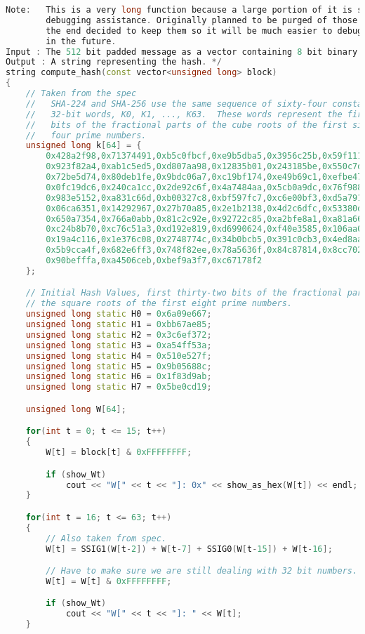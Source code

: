 \begin{lstlisting}[language = C++]
Note:	This is a very long function because a large portion of it is solely
		debugging assistance. Originally planned to be purged of those but in
		the end decided to keep them so it will be much easier to debug this
		in the future.
Input : The 512 bit padded message as a vector containing 8 bit binary ASCII values.
Output : A string representing the hash. */
string compute_hash(const vector<unsigned long> block)
{
	// Taken from the spec
	//   SHA-224 and SHA-256 use the same sequence of sixty-four constant
	//   32-bit words, K0, K1, ..., K63.  These words represent the first 32
	//   bits of the fractional parts of the cube roots of the first sixty-
	//   four prime numbers.
	unsigned long k[64] = {
		0x428a2f98,0x71374491,0xb5c0fbcf,0xe9b5dba5,0x3956c25b,0x59f111f1,
		0x923f82a4,0xab1c5ed5,0xd807aa98,0x12835b01,0x243185be,0x550c7dc3,
		0x72be5d74,0x80deb1fe,0x9bdc06a7,0xc19bf174,0xe49b69c1,0xefbe4786,
		0x0fc19dc6,0x240ca1cc,0x2de92c6f,0x4a7484aa,0x5cb0a9dc,0x76f988da,
		0x983e5152,0xa831c66d,0xb00327c8,0xbf597fc7,0xc6e00bf3,0xd5a79147,
		0x06ca6351,0x14292967,0x27b70a85,0x2e1b2138,0x4d2c6dfc,0x53380d13,
		0x650a7354,0x766a0abb,0x81c2c92e,0x92722c85,0xa2bfe8a1,0xa81a664b,
		0xc24b8b70,0xc76c51a3,0xd192e819,0xd6990624,0xf40e3585,0x106aa070,
		0x19a4c116,0x1e376c08,0x2748774c,0x34b0bcb5,0x391c0cb3,0x4ed8aa4a,
		0x5b9cca4f,0x682e6ff3,0x748f82ee,0x78a5636f,0x84c87814,0x8cc70208,
		0x90befffa,0xa4506ceb,0xbef9a3f7,0xc67178f2
	};

	// Initial Hash Values, first thirty-two bits of the fractional parts of
	// the square roots of the first eight prime numbers. 
	unsigned long static H0 = 0x6a09e667;
	unsigned long static H1 = 0xbb67ae85;
	unsigned long static H2 = 0x3c6ef372;
	unsigned long static H3 = 0xa54ff53a;
	unsigned long static H4 = 0x510e527f;
	unsigned long static H5 = 0x9b05688c;
	unsigned long static H6 = 0x1f83d9ab;
	unsigned long static H7 = 0x5be0cd19;

	unsigned long W[64];

	for(int t = 0; t <= 15; t++)
	{
		W[t] = block[t] & 0xFFFFFFFF;

		if (show_Wt)
			cout << "W[" << t << "]: 0x" << show_as_hex(W[t]) << endl;
	}

	for(int t = 16; t <= 63; t++)
	{
		// Also taken from spec.
		W[t] = SSIG1(W[t-2]) + W[t-7] + SSIG0(W[t-15]) + W[t-16];

		// Have to make sure we are still dealing with 32 bit numbers.
		W[t] = W[t] & 0xFFFFFFFF;

		if (show_Wt)
			cout << "W[" << t << "]: " << W[t];
	}


\end{lstlisting}
